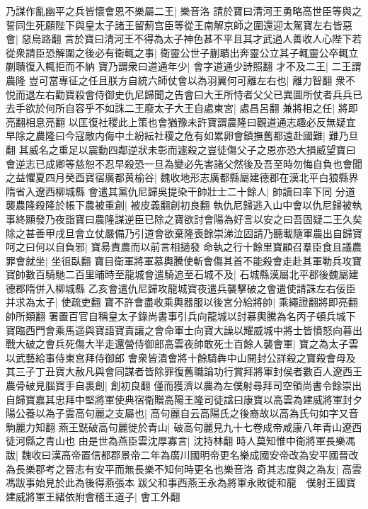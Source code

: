 乃謀作亂幽平之兵皆懷會恩不樂屬二王|{
	樂音洛}
請於寶曰清河王勇略高世臣等與之誓同生死願陛下與皇太子諸王留薊宫臣等從王南解京師之圍還迎太駕寶左右皆惡會|{
	惡烏路翻}
言於寶曰清河王不得為太子神色甚不平且其才武過人善收人心陛下若從衆請臣恐解圍之後必有衛輒之事|{
	衛靈公世子蒯聵出奔靈公立其子輒靈公卒輒立蒯聵復入輒拒而不納}
寶乃謂衆曰道通年少|{
	會字道通少詩照翻}
才不及二王|{
	二王謂農隆}
豈可當專征之任且朕方自統六師仗會以為羽翼何可離左右也|{
	離力智翻}
衆不悦而退左右勸寶殺會侍御史仇尼歸聞之告會曰大王所恃者父父已異圖所仗者兵兵已去手欲於何所自容乎不如誅二王廢太子大王自處東宮|{
	處昌呂翻}
兼將相之任|{
	將即亮翻相息亮翻}
以匡復社稷此上策也會猶豫未許寶謂農隆曰觀道通志趣必反無疑宜早除之農隆曰今寇敵内侮中土紛紜社稷之危有如累卵會鎮撫舊都遠赴國難|{
	難乃旦翻}
其威名之重足以震動四鄰逆狀未彰而遽殺之豈徒傷父子之恩亦恐大損威望寶曰會逆志已成卿等慈恕不忍早殺恐一旦為變必先害諸父然後及吾至時勿悔自負也會聞之益懼夏四月癸酉寶宿廣都黄榆谷|{
	魏收地形志廣都縣屬建德郡在漢北平白狼縣界隋省入遼西柳城縣}
會遣其黨仇尼歸吳提染干帥壯士二十餘人|{
	帥讀曰率下同}
分道襲農隆殺隆於帳下農被重創|{
	被皮義翻創初良翻}
執仇尼歸逃入山中會以仇尼歸被執事終顯發乃夜詣寶曰農隆謀逆臣已除之寶欲討會陽為好言以安之曰吾固疑二王久矣除之甚善甲戌旦會立仗嚴備乃引道會欲棄隆喪餘崇涕泣固請乃聽載隨軍農出自歸寶呵之曰何以自負邪|{
	寶昜責農而以前言相擿發}
命執之行十餘里寶顧召羣臣食且議農罪會就坐|{
	坐徂臥翻}
寶目衛軍將軍慕輿騰使斬會傷其首不能殺會走赴其軍勒兵攻寶寶帥數百騎馳二百里晡時至龍城會遣騎追至石城不及|{
	石城縣漢屬北平郡後魏屬建德郡隋併入柳城縣}
乙亥會遣仇尼歸攻龍城寶夜遣兵襲擊破之會遣使請誅左右佞臣并求為太子|{
	使疏吏翻}
寶不許會盡收乘輿器服以後宮分給將帥|{
	乘繩證翻將即亮翻帥所類翻}
署置百官自稱皇太子錄尚書事引兵向龍城以討慕輿騰為名丙子頓兵城下寶臨西門會乘馬遥與寶語寶責讓之會命軍士向寶大譟以耀威城中將士皆憤怒向暮出戰大破之會兵死傷大半走還營侍御郎高雲夜帥敢死士百餘人襲會軍|{
	寶之為太子雲以武藝給事侍東宫拜侍御郎}
會衆皆潰會將十餘騎犇中山開封公詳殺之寶殺會母及其三子丁丑寶大赦凡與會同謀者皆除罪復舊職論功行賞拜將軍封侯者數百人遼西王農骨破見腦寶手自裹創|{
	創初良翻}
僅而獲濟以農為左僕射尋拜司空領尚書令餘崇出自歸寶嘉其忠拜中堅將軍使典宿衛贈高陽王隆司徒諡曰康寶以高雲為建威將軍封夕陽公養以為子雲高句麗之支屬也|{
	高句麗自云高陽氏之後裔故以高為氏句如字又音駒麗力知翻}
燕王皝破高句麗徙於青山|{
	破高句麗見九十七卷成帝咸康八年青山遼西徒河縣之青山也}
由是世為燕臣雲沈厚寡言|{
	沈持林翻}
時人莫知惟中衛將軍長樂馮跋|{
	魏收曰漢高帝置信都郡景帝二年為廣川國明帝更名樂成國安帝改為安平國晉改為長樂郡考之晉志有安平而無長樂不知何時更名也樂音洛}
奇其志度與之為友|{
	高雲馮跋事始見於此為後得燕張本}
跋父和事西燕王永為將軍永敗徙和龍　僕射王國寶建威將軍王緒依附會稽王道子|{
	會工外翻}
